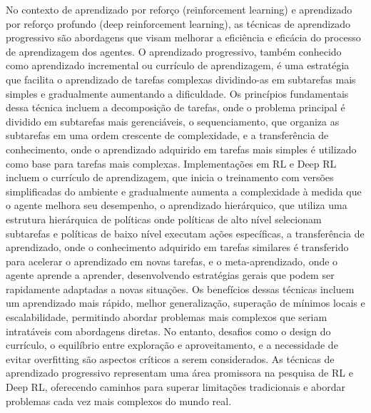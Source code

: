 No contexto de aprendizado por reforço (reinforcement learning) e aprendizado por reforço profundo (deep reinforcement learning), as técnicas de aprendizado progressivo são abordagens que visam melhorar a eficiência e eficácia do processo de aprendizagem dos agentes. O aprendizado progressivo, também conhecido como aprendizado incremental ou currículo de aprendizagem, é uma estratégia que facilita o aprendizado de tarefas complexas dividindo-as em subtarefas mais simples e gradualmente aumentando a dificuldade. Os princípios fundamentais dessa técnica incluem a decomposição de tarefas, onde o problema principal é dividido em subtarefas mais gerenciáveis, o sequenciamento, que organiza as subtarefas em uma ordem crescente de complexidade, e a transferência de conhecimento, onde o aprendizado adquirido em tarefas mais simples é utilizado como base para tarefas mais complexas. Implementações em RL e Deep RL incluem o currículo de aprendizagem, que inicia o treinamento com versões simplificadas do ambiente e gradualmente aumenta a complexidade à medida que o agente melhora seu desempenho, o aprendizado hierárquico, que utiliza uma estrutura hierárquica de políticas onde políticas de alto nível selecionam subtarefas e políticas de baixo nível executam ações específicas, a transferência de aprendizado, onde o conhecimento adquirido em tarefas similares é transferido para acelerar o aprendizado em novas tarefas, e o meta-aprendizado, onde o agente aprende a aprender, desenvolvendo estratégias gerais que podem ser rapidamente adaptadas a novas situações. Os benefícios dessas técnicas incluem um aprendizado mais rápido, melhor generalização, superação de mínimos locais e escalabilidade, permitindo abordar problemas mais complexos que seriam intratáveis com abordagens diretas. No entanto, desafios como o design do currículo, o equilíbrio entre exploração e aproveitamento, e a necessidade de evitar overfitting são aspectos críticos a serem considerados. As técnicas de aprendizado progressivo representam uma área promissora na pesquisa de RL e Deep RL, oferecendo caminhos para superar limitações tradicionais e abordar problemas cada vez mais complexos do mundo real\cite{https://www.semanticscholar.org/paper/3004b3eba73f4def2d36d2064eadc76c5244547d,https://www.semanticscholar.org/paper/f11594e47ce3f5872bd4d4868f23655025bb6511,https://www.semanticscholar.org/paper/b30e72c8f236951fe26024bfe49bda84e8bf133b,https://www.semanticscholar.org/paper/c984fdd5f847e46a9335c5aba982d31ceafbcb27,https://www.semanticscholar.org/paper/ece55442b2aee7f9db67c7fc58a6a857ed915fcd,https://www.semanticscholar.org/paper/801d0ef8c81c13a64228720b7d43660dcf664705,https://www.semanticscholar.org/paper/68fb81aa0a7d17ff07cb4c8d74cb78f0e67bbcca,https://www.semanticscholar.org/paper/1a4a43a3997e2694b6ce91ba33ebade1269a6256,https://www.semanticscholar.org/paper/67dd6e219a02aeb8f151eec2d8254e30cf7599dd}.

